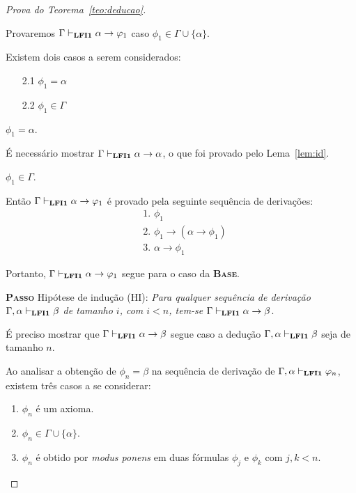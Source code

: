 \begin{proof}[Prova do Teorema~\ref{teo:deducao}]
\begin{provaporcasos}
                \casodeprova  Provaremos $\Gamma \vdash_{\textbf{LFI1}{}} \alpha \to \varphi_{1}$ caso $\phi_{1} \in \Gamma \cup \{\alpha\}$. 
                
                Existem dois casos a serem considerados:

                \begin{enumerate}
                    \item[2.1] $\phi_{1} = \alpha$
                    \item[2.2] $\phi_{1} \in \Gamma$
                \end{enumerate}

                \begin{provaporsubcasos}
                    \subcasodeprova $\phi_{1} = \alpha$. 
                    
                        É necessário mostrar $\Gamma \vdash_{\textbf{LFI1}{}} \alpha \to \alpha$, o que foi provado pelo Lema~\ref{lem:id}.

                    \subcasodeprova $\phi_{1} \in \Gamma$.
                    
                        Então $\Gamma \vdash_{\textbf{LFI1}{}} \alpha \to \varphi_{1}$ é provado pela seguinte sequência de derivações:
                        \begin{align*}
                            & \text{1. } \phi_{1} \tag{Premissa}\\
                            & \text{2. } \phi_{1} \to (\alpha \to \phi_{1}) \tag{Ax1}\\
                            & \text{3. } \alpha \to \phi_{1} \tag{MP 1, 2}
                        \end{align*}
                \end{provaporsubcasos}
                
            \end{provaporcasos}
            
            Portanto, $\Gamma \vdash_{\textbf{LFI1}{}} \alpha \to \varphi_{1}$ segue para o caso da \textbf{\textsc{Base}}.

        \noindent \textbf{\textsc{Passo}} Hipótese de indução (HI): \textit{Para qualquer sequência de derivação $\Gamma, \alpha \vdash_{\textbf{LFI1}{}} \beta$ de tamanho $i$, com $i < n$, tem-se $\Gamma \vdash_{\textbf{LFI1}{}} \alpha \to \beta$}. 
        
        É preciso mostrar que $\Gamma \vdash_{\textbf{LFI1}{}} \alpha \to \beta$ segue caso a dedução $\Gamma, \alpha \vdash_{\textbf{LFI1}{}} \beta$ seja de tamanho $n$. 
        
        Ao analisar a obtenção de $\phi_{n} = \beta$ na sequência de derivação de $\Gamma, \alpha\vdash_{\textbf{LFI1}{}} \varphi_{n}$, existem três casos a se considerar:
        \begin{enumerate}
            \item $\phi_{n}$ é um axioma.
            \item $\phi_{n} \in \Gamma \cup \{\alpha\}$.
            \item $\phi_{n}$ é obtido por \textit{modus ponens} em duas fórmulas $\phi_{j}$ e $\phi_{k}$ com $j, k < n$.
        \end{enumerate}
        

\end{proof}
